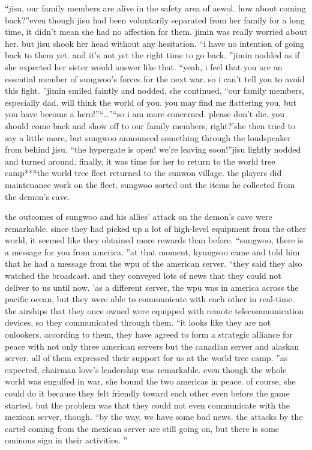“jisu, our family members are alive in the safety area of aewol.
 how about coming back?”even though jisu had been voluntarily separated from her family for a long time, it didn’t mean she had no affection for them.
 jimin was really worried about her.
but jisu shook her head without any hesitation.
“i have no intention of going back to them yet.
 and it’s not yet the right time to go back.
”jimin nodded as if she expected her sister would answer like that.
“yeah, i feel that you are an essential member of sungwoo’s forces for the next war.
 so i can’t tell you to avoid this fight.
”jimin smiled faintly and nodded.
she continued, “our family members, especially dad, will think the world of you.
 you may find me flattering you, but you have become a hero!”“…”“so i am more concerned.
 please don’t die.
 you should come back and show off to our family members, right?’she then tried to say a little more, but sungwoo announced something through the loudspeaker from behind jisu.
“the hypergate is open! we’re leaving soon!”jisu lightly nodded and turned around.
 finally, it was time for her to return to the world tree camp***the world tree fleet returned to the sunwon village.
 the players did maintenance work on the fleet.
 sungwoo sorted out the items he collected from the demon’s cave.


the outcomes of sungwoo and his allies’ attack on the demon’s cave were remarkable.
 since they had picked up a lot of high-level equipment from the other world, it seemed like they obtained more rewards than before.
“sungwoo, there is a message for you from america.
”at that moment, kyungsoo came and told him that he had a message from the wpu of the american server.
“they said they also watched the broadcast.
 and they conveyed lots of news that they could not deliver to us until now.
’as a different server, the wpu was in america across the pacific ocean, but they were able to communicate with each other in real-time.
 the airships that they once owned were equipped with remote telecommunication devices, so they communicated through them.
“it looks like they are not onlookers.
 according to them, they have agreed to form a strategic alliance for peace with not only three american servers but the canadian server and alaskan server.
 all of them expressed their support for us at the world tree camp.
”as expected, chairman love’s leadership was remarkable.
 even though the whole world was engulfed in war, she bound the two americas in peace.
of course, she could do it because they felt friendly toward each other even before the game started.
but the problem was that they could not even communicate with the mexican server, though.
“by the way, we have some bad news.
 the attacks by the cartel coming from the mexican server are still going on, but there is some ominous sign in their activities.
”

 